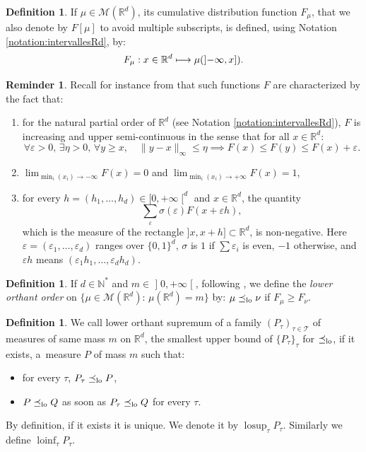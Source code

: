 \documentclass[JEP,XML,SOM,Unicode,NoEqCountersInSection,NoFloatCountersInSection,published]{cedram}
\newcommand\mto{\mathchoice{\longmapsto}{\mapsto}{\mapsto}{\mapsto}}
\theoremstyle{plain}
\theoremstyle{definition}
\newtheorem{defi}[them]{Definition}
\newtheorem{reminder}[them]{Reminder}
\newcommand{\Tt}{{\mathcal T}}
\let\eps\varepsilon
\newcommand{\m}{\mathcal{M}}
\newcommand{\R}{\mathbb{R}}
\newcommand{\N}{\mathbb{N}}
\newcommand{\lcsup}{\operatorname{losup}}
\newcommand{\lcinf}{\operatorname{loinf}}
\newcommand{\op}{\mathopen}
\newcommand{\clo}{\mathclose}
\newcommand{\leqlc}{\preceq_{\rm lo}}
\begin{document}
\begin{defi}\label{def:cumul}
If $\mu\in\m(\R^d)$, its cumulative distribution function $F_\mu$, that we also denote by $F[\mu]$ to avoid multiple subscripts, is defined, using Notation \ref{notation:intervallesRd}, by:
\[F_\mu:x\in\R^d\mto\mu(\op]-\infty,x]).\]
\end{defi}

\begin{reminder}\label{remind:F}
Recall for instance from \cite[Th.\,3.25]{Kal} that such functions $F$ are characterized by the fact that:
\begin{enumerate}
\item
\label{item:Fonctions_partielles} for the natural partial order of $\R^d$ (see Notation \ref{notation:intervallesRd}), $F$ is increasing and upper semi-continuous in the sense that for all $x\in\R^d$:
\begin{equation}\label{eq:usc}
\forall\varepsilon>0,\,\exists\eta>0,\,\forall y\geqslant x,\quad \|y-x\|_\infty\leqslant\eta\implies F(x)\leqslant F(y)\leqslant F(x)+\varepsilon.
\end{equation}

\item
\label{item:Flimite} $\lim_{\min_i(x_i)\to-\infty} F(x)=0$ and $\lim_{\min_i(x_i)\to+\infty} F(x)=1$,

\item
\label{item:Fdifferences_croisees} for every $h=(h_1,\ldots,h_d)\in[0,+\infty\clo[^d$ and $x
\in \R^d$, the quantity
\[
\sum_{\eps} \sigma(\eps) F(x+\eps h),
\]
which is the measure of the rectangle $]x,x+h]\subset \R^d$, is non-negative. Here $\eps=(\eps_1,\ldots,\eps_d)$ ranges over $\{0,1\}^d$, $\sigma$ is $1$ if $\sum \eps_i$ is even, $-1$ otherwise, and $\eps h$ means $(\eps_1h_1,\ldots,\eps_dh_d)$.
\end{enumerate}
\end{reminder}

\begin{defi}\label{defi:geqlc} If $d\in\N^\ast$ and $m\in\op]0,+\infty\clo[$, following \cite[\S 6.G]{SS}, we define the \emph{lower orthant order} on $\{\mu\in\m(\R^d):\,\mu(\R^d)=m\}$ by: $\mu\leqlc\nu$ if $F_\mu\geqslant F_\nu$.
\end{defi}

\begin{defi}\label{def:lcsup}We call lower orthant supremum of a family $(P_\tau)_{\tau\in\Tt}$ of measures of same mass $m$ on $\R^d$, the smallest upper bound of $\{P_\tau\} _\tau$ for $\leqlc$, if it exists, \ie a~measure $P$ of mass $m$ such that:
\begin{itemize}
\item
for every $\tau$, $P_\tau\leqlc P$,
\item
$P\leqlc Q$ as soon as $P_\tau\leqlc Q$ for every $\tau$.
\end{itemize}
By definition, if it exists it is unique. We denote it by $\lcsup_\tau P_\tau$. Similarly we define $\lcinf_\tau P_\tau$.
\end{defi}
\end{document}
